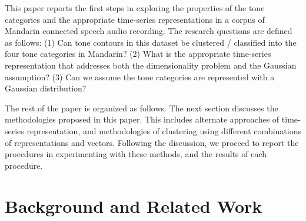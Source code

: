 \documentclass{article}
\begin{document}

This paper reports the first steps in exploring the properties of the tone categories and the appropriate time-series representations in a corpus of Mandarin connected speech audio recording. The research questions are defined as follows: (1) Can tone contours in this dataset be clustered / classified into the four tone categories in Mandarin? (2) What is the appropriate time-series representation that addresses both the dimensionality problem and the Gaussian assumption? (3) Can we assume the tone categories are represented with a Gaussian distribution? 

The rest of the paper is organized as follows. The next section discusses the methodologies proposed in this paper. This includes alternate approaches of time-series representation, and methodologies of clustering using different combinations of representations and vectors. Following the discussion, we proceed to report the procedures in experimenting with these methods, and the results of each procedure.











\section{Background and Related Work}


\subsection{}
\end{document}
